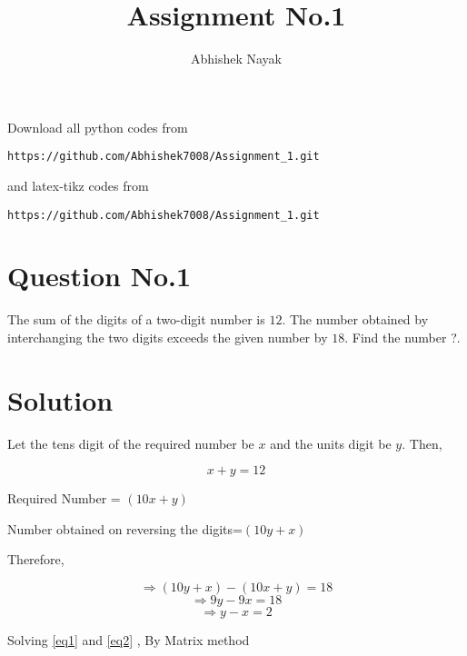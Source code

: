 \documentclass[journal,12pt,twocolumn]{IEEEtran}
\begin{document}
\def\rightbox#1{\makebox[0in][r]{#1}}
\def\centbox#1{\makebox[0in]{#1}}
\def\topbox#1{\raisebox{-\baselineskip}[0in][0in]{#1}}
\def\midbox#1{\raisebox{-0.5\baselineskip}[0in][0in]{#1}}
\vspace{3cm}
\title{Assignment No.1}
\author{Abhishek Nayak}
\maketitle
\newpage
\bigskip
\renewcommand{\thefigure}{\theenumi}
\renewcommand{\thetable}{\theenumi}
Download all python codes from
\begin{lstlisting}
https://github.com/Abhishek7008/Assignment_1.git
\end{lstlisting}
%
and latex-tikz codes from
%
\begin{lstlisting}
https://github.com/Abhishek7008/Assignment_1.git
\end{lstlisting}
%
\section{Question No.1}

The sum of the digits of a two-digit number is $12$. The number obtained by interchanging the two digits exceeds the given number by $18$. Find the number ?.

\section{Solution}

Let the tens digit of the required number be $x$ and the units digit be $y$. Then,

\begin{equation}
    x+y=12\label{eq1}
\end{equation}
   
Required Number = $(10x+y)$

Number obtained on reversing the digits=$(10y+x)$

Therefore,

\begin{equation*}
\Rightarrow (10y+x)-(10x+y)= 18
\end{equation*}
\begin{equation*}
\Rightarrow  9y-9x=18
\end{equation*}
\begin{equation}
 \Rightarrow y-x=2\label{eq2}
\end{equation}

 Solving  \ref{eq1} and \ref{eq2} , By Matrix method \\
\end{document}
